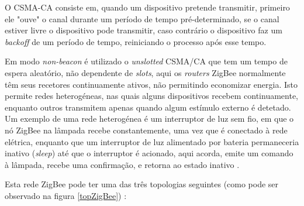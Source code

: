 \documentclass[conference]{IEEEtran}
\begin{document}
O CSMA-CA consiste em, quando um dispositivo pretende transmitir, primeiro ele "ouve" o canal durante um período de tempo pré-determinado, se o canal estiver livre o dispositivo pode transmitir, caso contrário o dispositivo faz um \textit{backoff} de um período de tempo, reiniciando o processo após esse tempo.

Em modo \textit{non-beacon} é utilizado o \textit{unslotted} CSMA/CA que tem um tempo de espera aleatório, não dependente de \textit{slots}, aqui os \textit{routers} ZigBee normalmente têm seus recetores continuamente ativos, não permitindo economizar energia.
Isto permite redes heterogéneas, nas quais alguns dispositivos recebem continuamente, enquanto outros transmitem apenas quando algum estímulo externo é detetado. 
Um exemplo de uma rede heterogénea é um interruptor de luz sem fio, em que o nó ZigBee na lâmpada recebe constantemente, uma vez que é conectado à rede elétrica, enquanto que um interruptor de luz alimentado por bateria permaneceria inativo (\textit{sleep}) até que o interruptor é acionado, aqui acorda, emite um comando à lâmpada, recebe uma confirmação, e retorna ao estado inativo \cite{zigbee_online}.

Esta rede ZigBee pode ter uma das três topologias seguintes (como pode ser observado na figura \ref{topZigBee}) \cite{sinem2004zigbee}:
\end{document}
